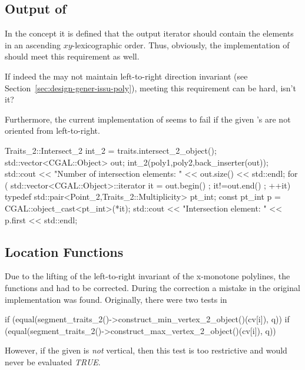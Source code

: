 \documentclass[a4paper,10pt]{article}
\begin{document}
\subsection{Output of }
\label{sec:outp-funct-intersect-2}

In the concept  it is defined that the output iterator should contain the elements in an ascending \(xy\)-lexicographic order.
Thus, obviously, the implementation of  should meet this requirement as well.
\begin{queframe}
  If indeed the \xpoly may not maintain left-to-right direction invariant (see Section~\ref{sec:design-gener-issu-poly}), meeting this requirement can be hard, isn't it?

  Furthermore, the current implementation of  seems to fail if the given \xpoly's are not oriented from left-to-right.
  \begin{pyglist}[language=c++]
    Traits_2::Intersect_2 int_2 = traits.intersect_2_object();
    std::vector<CGAL::Object> out;
    int_2(poly1,poly2,back_inserter(out));
    std::cout << "Number of intersection elements: " << out.size() << std::endl;
    for (
    std::vector<CGAL::Object>::iterator it = out.begin() ;
    it!=out.end() ; ++it)
    {
      typedef std::pair<Point_2,Traits_2::Multiplicity> pt_int;
      const pt_int p =
      CGAL::object_cast<pt_int>(*it);
      std::cout << "Intersection element: " << p.first << std::endl;
    }
  \end{pyglist}
\end{queframe}

\subsection{Location Functions}
\label{sec:location-functions-polytr}

Due to the lifting of the left-to-right invariant of the x-monotone polylines, the functions  and  had to be corrected.
During the correction a mistake in the original implementation was found.
Originally, there were two tests in 
\begin{pyglist}
  if (equal(segment_traits_2()->construct_min_vertex_2_object()(cv[i]), q))
  if (equal(segment_traits_2()->construct_max_vertex_2_object()(cv[i]), q))
\end{pyglist}
However, if the given \xpoly is \emph{not} vertical, then this test is too restrictive and would never be evaluated \emph{TRUE}.
\end{document}
